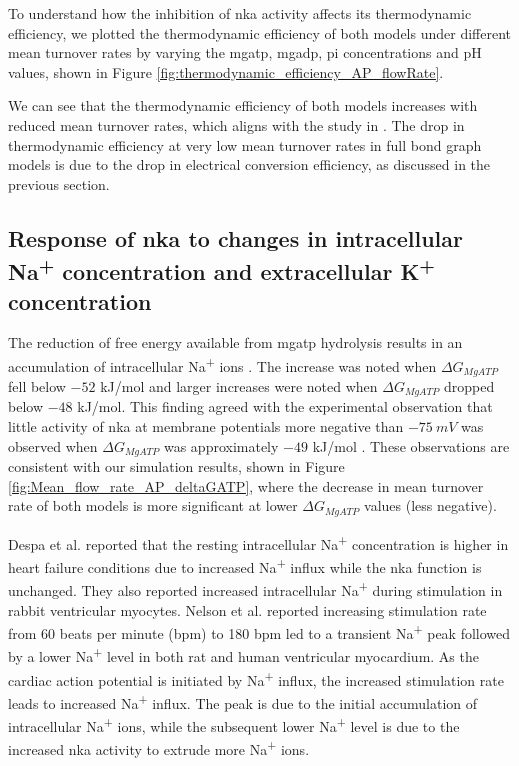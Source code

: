 \documentclass{biophys-new}
\begin{document}
To understand how the inhibition of \gls{nka} activity affects its thermodynamic efficiency, we plotted the thermodynamic efficiency of both models under different mean turnover rates by varying the \gls{mgatp}, \gls{mgadp}, \gls{pi} concentrations and pH values, shown in Figure \ref{fig:thermodynamic_efficiency_AP_flowRate}.

We can see that the thermodynamic efficiency of both models increases with reduced mean turnover rates, which aligns with the study in \cite{wagoner_mechanisms_2019}.
The drop in thermodynamic efficiency at very low mean turnover rates in full bond graph models is due to the drop in electrical conversion efficiency, as discussed in the previous section.


\subsection*{Response of \Gls{nka} to changes in intracellular \texorpdfstring{Na\textsuperscript{+}}{Lg} concentration and extracellular \texorpdfstring{K\textsuperscript{+}}{Lg} concentration}

The reduction of free energy available from \gls{mgatp} hydrolysis results in an accumulation of intracellular Na\textsuperscript{+} ions \cite{jansen2003energy}.
The increase was noted when $\Delta G_{MgATP}$ fell below $-52$ kJ/mol and larger increases were noted when $\Delta G_{MgATP}$ dropped below $-48$ kJ/mol.
This finding agreed with the experimental observation that little activity of \gls{nka} at membrane potentials more negative than $-75~mV$ was observed when $\Delta G_{MgATP}$ was approximately $-49$ kJ/mol \cite{glitsch_change_1995}.
These observations are consistent with our simulation results, shown in Figure \ref{fig:Mean_flow_rate_AP_deltaGATP}, where the decrease in mean turnover rate of both models is more significant at lower $\Delta G_{MgATP}$ values (less negative).

Despa et al. \cite{despa_intracellular_2002} reported that the resting intracellular Na\textsuperscript{+} concentration is higher in heart failure conditions due to increased Na\textsuperscript{+} influx while the \gls{nka} function is unchanged.
They also reported increased intracellular Na\textsuperscript{+} during stimulation in rabbit ventricular myocytes.
Nelson et al.\cite{nelson_heart_2022} reported increasing stimulation rate from 60 beats per minute (bpm) to 180 bpm led to a transient Na\textsuperscript{+} peak followed by a lower Na\textsuperscript{+} level in both rat and human ventricular myocardium.
As the cardiac action potential is initiated by Na\textsuperscript{+} influx, the increased stimulation rate leads to increased Na\textsuperscript{+} influx. The peak is due to the initial accumulation of intracellular Na\textsuperscript{+} ions, while the subsequent lower Na\textsuperscript{+} level is due to the increased \gls{nka} activity to extrude more Na\textsuperscript{+} ions.
\end{document}
